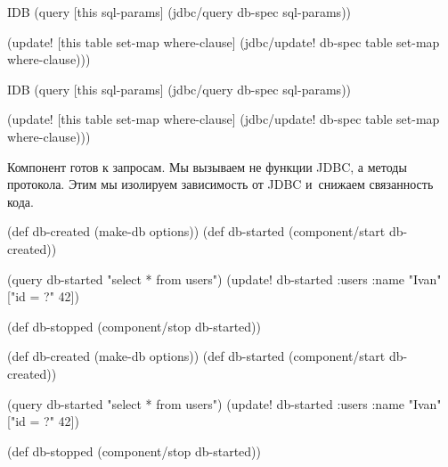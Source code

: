 \ifx\DEVICETYPE\MOBILE

\begin{english}
  \begin{clojure}
  IDB
  (query [this sql-params]
    (jdbc/query db-spec sql-params))

  (update!
    [this table set-map where-clause]
    (jdbc/update! db-spec
      table set-map where-clause)))
  \end{clojure}
\end{english}

\else

\begin{english}
  \begin{clojure}
  IDB
  (query [this sql-params]
    (jdbc/query db-spec sql-params))

  (update! [this table set-map where-clause]
    (jdbc/update! db-spec table set-map where-clause)))
  \end{clojure}
\end{english}

\fi

Компонент готов к запросам. Мы вызываем не функции JDBC, а методы
протокола. Этим мы изолируем зависимость от JDBC и~снижаем связанность кода.

\ifx\DEVICETYPE\MOBILE

\begin{english}
  \begin{clojure}
(def db-created (make-db options))
(def db-started
  (component/start db-created))

(query db-started "select * from users")
(update! db-started
  :users {:name "Ivan"} ["id = ?" 42])

(def db-stopped
  (component/stop db-started))
  \end{clojure}
\end{english}

\else

\begin{english}
  \begin{clojure}
(def db-created (make-db options))
(def db-started (component/start db-created))

(query db-started "select * from users")
(update! db-started :users {:name "Ivan"} ["id = ?" 42])

(def db-stopped (component/stop db-started))
  \end{clojure}
\end{english}

\fi

